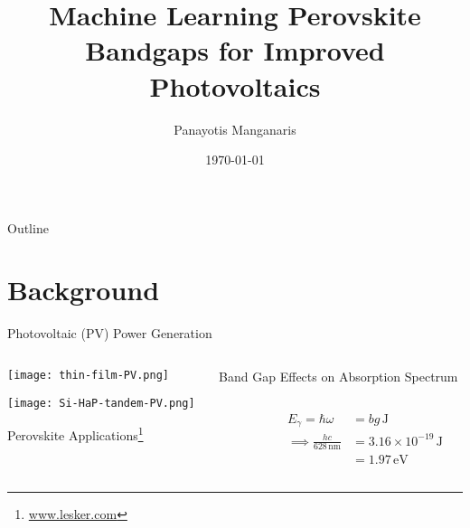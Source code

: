 \documentclass[10pt, aspectratio=169, presentation]{beamer}
\institute[Mannodi Group]{\large{}
\inst{1} Purdue Materials Engineering\\Advisor Arun Mannodi-Kanakkithodi
}
\author{\large{}Panayotis Manganaris\inst{1}}
\date{\today}
\title{\Huge{}Machine Learning Perovskite Bandgaps for Improved Photovoltaics}
\begin{document}
\maketitle
\begin{frame}{Outline}
\tableofcontents
\end{frame}

\section{Background}
\label{sec:org3f74446}
\begin{frame}[label={sec:org1289bf1}]{Photovoltaic (PV) Power Generation}
\begin{columns}
\begin{column}{0.3\columnwidth}
\begin{center}
\texttt{[image: thin-film-PV.png]}
\end{center}
\begin{center}
\texttt{[image: Si-HaP-tandem-PV.png]}
\end{center}

\tiny{}\center{}Perovskite Applications\footnote{\tiny{}\href{https://www.lesker.com/newweb/ped/applications/perovskite-research.cfm }{www.lesker.com}}
\end{column}

\begin{column}{0.7\columnwidth}
\begin{block}{Band Gap Effects on Absorption Spectrum}
\begin{columns}
\begin{column}{0.5\columnwidth}
 
\begin{center}

\end{center}
\end{column}

\begin{column}{0.5\columnwidth}
\begin{align*}
E_\gamma = \hbar\omega &= bg\,\si{\joule} \\
\implies \frac{hc}{628\,\si{\nano\meter}} &= 3.16\times{}10^{-19}\,\si{\joule}\\
&= 1.97\,\si{\electronvolt}
\end{align*}
\end{column}
\end{columns}
\end{block}


\end{column}
\end{columns}
\end{frame}
\end{document}

